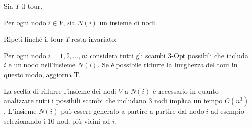 \documentclass[a4paper,12pt]{report}
\begin{document}
\begin{tcolorbox}[colframe=black,colback=white,boxrule=0.5pt, sharp corners]
  \begin{legal}
    \item Sia $T$ il tour.
    \item Per ogni nodo $i \in V$, sia $N(i)$ un insieme di nodi.
    \item Ripeti finché il tour $T$ resta invariato:
    \begin{legal}
      \item Per ogni nodo $i = 1, 2, ..., n$: considera tutti gli scambi 3-Opt possibili che includa $i$ e un nodo nell'insieme $N(i)$. Se è possibile ridurre la lunghezza del tour in questo modo, aggiorna T.
    \end{legal}
  \end{legal}
\end{tcolorbox}
\hfill \break
La scelta di ridurre l'insieme dei nodi $V$ a $N(i)$ è necessario in quanto analizzare tutti i possibili scambi che includano 3 nodi implica un tempo $O(n^3)$. L'insieme $N(i)$ può essere generato a partire a partire dal nodo $i$ ad esempio selezionando i 10 nodi più vicini ad $i$.
      
\end{document}
